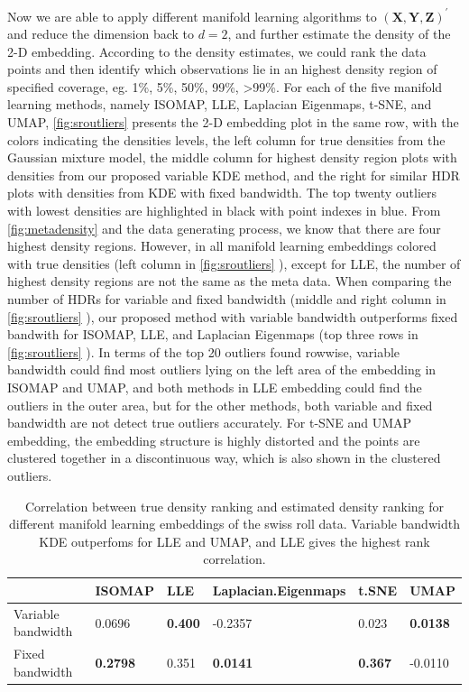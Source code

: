 \documentclass[11pt,a4paper,]{article}
\begin{document}
Now we are able to apply different manifold learning algorithms to \((\pmb{X}, \pmb{Y}, \pmb{Z})^\prime\) and reduce the dimension back to \(d=2\), and further estimate the density of the 2-D embedding. According to the density estimates, we could rank the data points and then identify which observations lie in an highest density region of specified coverage, eg. 1\%, 5\%, 50\%, 99\%, \textgreater99\%. For each of the five manifold learning methods, namely ISOMAP, LLE, Laplacian Eigenmaps, t-SNE, and UMAP, \autoref{fig:sroutliers} presents the 2-D embedding plot in the same row, with the colors indicating the densities levels, the left column for true densities from the Gaussian mixture model, the middle column for highest density region plots with densities from our proposed variable KDE method, and the right for similar HDR plots with densities from KDE with fixed bandwidth. The top twenty outliers with lowest densities are highlighted in black with point indexes in blue.
From \autoref{fig:metadensity} and the data generating process, we know that there are four highest density regions. However, in all manifold learning embeddings colored with true densities (left column in \autoref{fig:sroutliers} ), except for LLE, the number of highest density regions are not the same as the meta data. When comparing the number of HDRs for variable and fixed bandwidth (middle and right column in \autoref{fig:sroutliers} ), our proposed method with variable bandwidth outperforms fixed bandwith for ISOMAP, LLE, and Laplacian Eigenmaps (top three rows in \autoref{fig:sroutliers} ).
In terms of the top 20 outliers found rowwise, variable bandwidth could find most outliers lying on the left area of the embedding in ISOMAP and UMAP, and both methods in LLE embedding could find the outliers in the outer area, but for the other methods, both variable and fixed bandwidth are not detect true outliers accurately. For t-SNE and UMAP embedding, the embedding structure is highly distorted and the points are clustered together in a discontinuous way, which is also shown in the clustered outliers.

\begin{table}

\caption{\label{tab:srcors}Correlation between true density ranking and estimated density ranking for different manifold learning embeddings of the swiss roll data. Variable bandwidth KDE outperfoms for LLE and UMAP, and LLE gives the highest rank correlation.}
\centering
\begin{tabular}[t]{l>{}l>{}l>{}l>{}l>{}l}
\toprule
  & ISOMAP & LLE & Laplacian.Eigenmaps & t.SNE & UMAP\\
\midrule
Variable bandwidth & 0.0696 & \textbf{0.400} & -0.2357 & 0.023 & \textbf{0.0138}\\
Fixed bandwidth & \textbf{0.2798} & 0.351 & \textbf{0.0141} & \textbf{0.367} & -0.0110\\
\bottomrule
\end{tabular}
\end{table}
\end{document}
